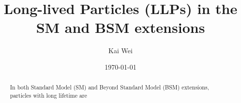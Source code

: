 \documentclass[%
twocolumn,
 amsmath,amssymb,
prb,
floatfix,
]{revtex4-2}
\begin{document}

\title{Long-lived Particles (LLPs) in the SM and BSM extensions}%

\author{Kai Wei}
%


\date{\today}%

\begin{abstract}
In both Standard Model (SM) and Beyond Standard Model (BSM) extensions, particles with long lifetime are 
\end{abstract}

\maketitle


















\appendix



\nocite{*}

\end{document}
